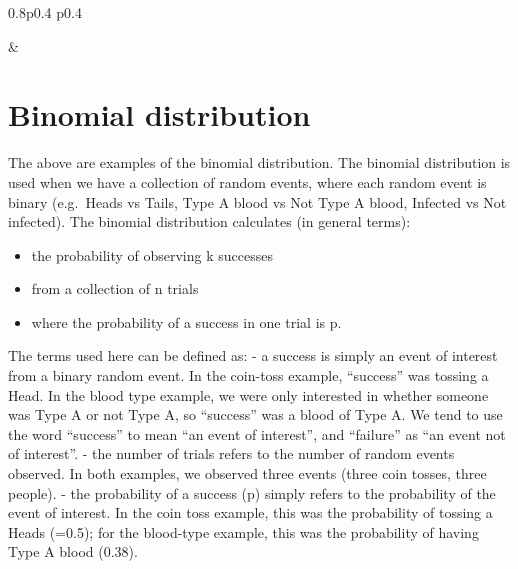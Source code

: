 \documentclass[
]{memoir}
\providecommand{\tightlist}{%
  \setlength{\itemsep}{0pt}\setlength{\parskip}{0pt}}
\begin{document}
\begin{table}[ht]
\begin{centerbox}
\begin{threeparttable}
\begin{tabularx}{0.8\textwidth}{p{} p{}}
\hhline{}

 &
 \tabularnewline[-0.5pt]


\end{tabularx}
\end{threeparttable}\par\end{centerbox}

\end{table}
 

\hypertarget{binomial-distribution}{%
\section{Binomial distribution}\label{binomial-distribution}}

The above are examples of the binomial distribution. The binomial distribution is used when we have a collection of random events, where each random event is binary (e.g.~Heads vs Tails, Type A blood vs Not Type A blood, Infected vs Not infected). The binomial distribution calculates (in general terms):

\begin{itemize}
\tightlist
\item
  the probability of observing k successes
\item
  from a collection of n trials
\item
  where the probability of a success in one trial is p.
\end{itemize}

The terms used here can be defined as:
- a success is simply an event of interest from a binary random event. In the coin-toss example, ``success'' was tossing a Head. In the blood type example, we were only interested in whether someone was Type A or not Type A, so ``success'' was a blood of Type A. We tend to use the word ``success'' to mean ``an event of interest'', and ``failure'' as ``an event not of interest''.
- the number of trials refers to the number of random events observed. In both examples, we observed three events (three coin tosses, three people).
- the probability of a success (p) simply refers to the probability of the event of interest. In the coin toss example, this was the probability of tossing a Heads (=0.5); for the blood-type example, this was the probability of having Type A blood (0.38).
\end{document}
